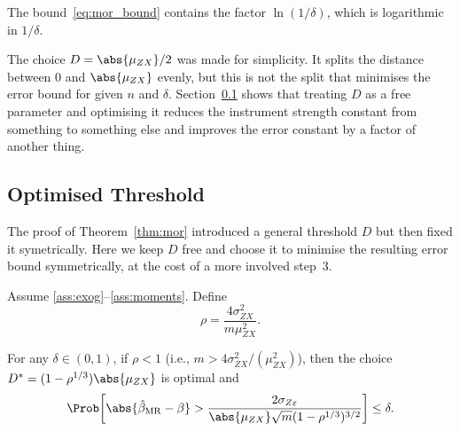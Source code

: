 \begin{remark}
\label{rem:iv_polynomial}
    The bound~\eqref{eq:mor_bound} contains the factor $\ln{(1/\delta)}$, which is logarithmic in $1/\delta$.
\end{remark}

\begin{remark}
\label{rem:iv_D_choice}
    The choice $D = \abs{\mu_{ZX}}/2$ was made for simplicity. It splits the distance between $0$ and $\abs{\mu_{ZX}}$ evenly, but this is not the split that minimises the error bound for given $n$ and $\delta$. Section~\ref{sec:mor_optimised} shows that treating $D$ as a free parameter and optimising it reduces the instrument strength constant from something to something else and improves the error constant by a factor
    of another thing.
\end{remark}


\subsection{Optimised Threshold}
\label{sec:mor_optimised}

The proof of Theorem~\ref{thm:mor} introduced a general threshold $D$ but then
fixed it symetrically. Here we keep $D$ free and choose it to minimise the
resulting error bound symmetrically, at the cost of a more involved step~3.

\begin{theorem}
\label{thm:mor_opt}
    Assume \ref{ass:exog}--\ref{ass:moments}. Define
    \[
        \rho = \frac{4\sigma_{ZX}^2}{m\mu_{ZX}^2}.
    \]

    For any $\delta\in(0,1)$, if $\rho < 1$ (i.e., $m > 4\sigma_{ZX}^2/(\mu_{ZX}^2)$),
    then the choice $D^* = (1-\rho^{1/3})\abs{\mu_{ZX}}$ is optimal and
    \begin{equation}
    \label{eq:mor_bound_opt}
        \Prob\!\left[\abs{\hat{\beta}_{\mathrm{MR}} - \beta} > \frac{2\sigma_{Z\varepsilon}}{\abs{\mu_{ZX}}\sqrt{m}(1-\rho^{1/3})^{3/2}} \right] \leq \delta.
    \end{equation}
\end{theorem}

